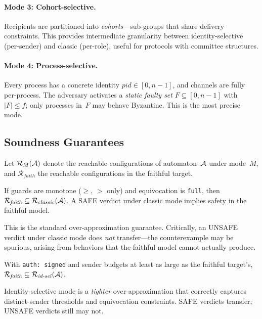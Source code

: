 \paragraph{Mode 3: Cohort-selective.}
Recipients are partitioned into \emph{cohorts}---sub-groups that share
delivery constraints.  This provides intermediate granularity between
identity-selective (per-sender) and classic (per-role), useful for
protocols with committee structures.

\paragraph{Mode 4: Process-selective.}
Every process has a concrete identity $\mathit{pid} \in [0, n{-}1]$,
and channels are fully per-process.  The adversary activates a
\emph{static faulty set} $F \subseteq [0, n{-}1]$ with $|F| \leq f$;
only processes in~$F$ may behave Byzantine.  This is the most precise
mode.

\subsection{Soundness Guarantees}\label{sec:transfer}

Let $\mathcal{R}_M(\mathcal{A})$ denote the reachable configurations of
automaton~$\mathcal{A}$ under mode~$M$, and $\mathcal{R}_{\mathit{faith}}$ the
reachable configurations in the faithful target.

\begin{theorem}\label{thm:classic}
If guards are monotone ($\geq$, $>$ only) and equivocation is
\texttt{full}, then
$\mathcal{R}_{\mathit{faith}} \subseteq
 \mathcal{R}_{\mathit{classic}}(\mathcal{A})$.
A SAFE verdict under classic mode implies safety in the faithful model.
\end{theorem}

This is the standard over-approximation guarantee.  Critically, an
UNSAFE verdict under classic mode does \emph{not} transfer---the
counterexample may be spurious, arising from behaviors that the
faithful model cannot actually produce.

\begin{theorem}\label{thm:idsel}
With \texttt{auth: signed} and sender budgets at least as large as
the faithful target's,
$\mathcal{R}_{\mathit{faith}} \subseteq
 \mathcal{R}_{\mathit{id\text{-}sel}}(\mathcal{A})$.
\end{theorem}

Identity-selective mode is a \emph{tighter} over-approximation that
correctly captures distinct-sender thresholds and equivocation
constraints.  SAFE verdicts transfer; UNSAFE verdicts still may not.

